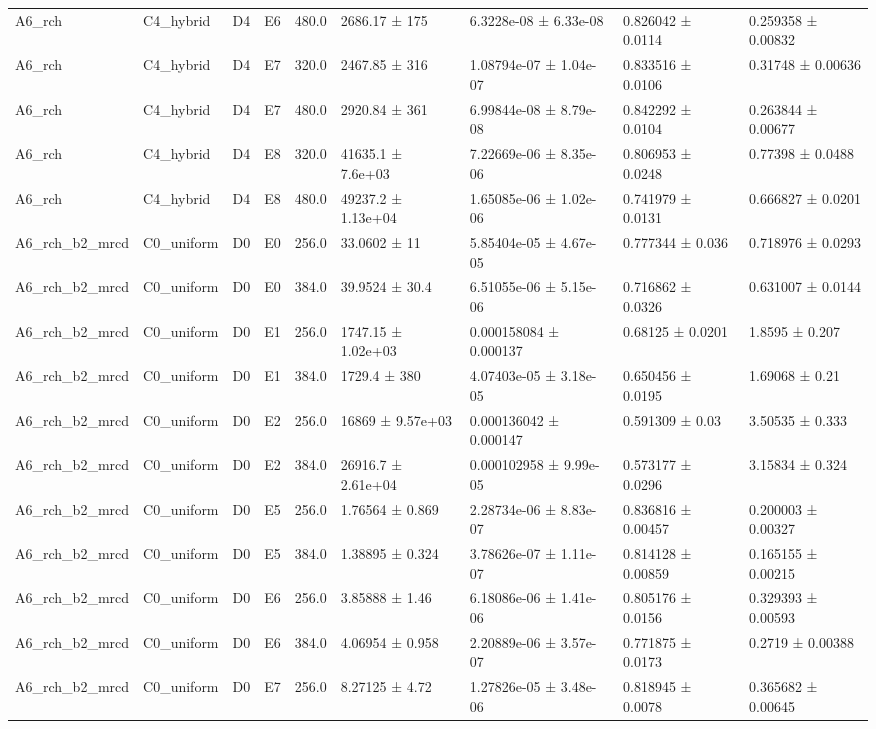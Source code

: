 \begin{table}
\begin{tabular}{lllllllll}
A6\_rch & C4\_hybrid & D4 & E6 & 480.0 & 2686.17 ± 175 & 6.3228e-08 ± 6.33e-08 & 0.826042 ± 0.0114 & 0.259358 ± 0.00832 \\
A6\_rch & C4\_hybrid & D4 & E7 & 320.0 & 2467.85 ± 316 & 1.08794e-07 ± 1.04e-07 & 0.833516 ± 0.0106 & 0.31748 ± 0.00636 \\
A6\_rch & C4\_hybrid & D4 & E7 & 480.0 & 2920.84 ± 361 & 6.99844e-08 ± 8.79e-08 & 0.842292 ± 0.0104 & 0.263844 ± 0.00677 \\
A6\_rch & C4\_hybrid & D4 & E8 & 320.0 & 41635.1 ± 7.6e+03 & 7.22669e-06 ± 8.35e-06 & 0.806953 ± 0.0248 & 0.77398 ± 0.0488 \\
A6\_rch & C4\_hybrid & D4 & E8 & 480.0 & 49237.2 ± 1.13e+04 & 1.65085e-06 ± 1.02e-06 & 0.741979 ± 0.0131 & 0.666827 ± 0.0201 \\
A6\_rch\_b2\_mrcd & C0\_uniform & D0 & E0 & 256.0 & 33.0602 ± 11 & 5.85404e-05 ± 4.67e-05 & 0.777344 ± 0.036 & 0.718976 ± 0.0293 \\
A6\_rch\_b2\_mrcd & C0\_uniform & D0 & E0 & 384.0 & 39.9524 ± 30.4 & 6.51055e-06 ± 5.15e-06 & 0.716862 ± 0.0326 & 0.631007 ± 0.0144 \\
A6\_rch\_b2\_mrcd & C0\_uniform & D0 & E1 & 256.0 & 1747.15 ± 1.02e+03 & 0.000158084 ± 0.000137 & 0.68125 ± 0.0201 & 1.8595 ± 0.207 \\
A6\_rch\_b2\_mrcd & C0\_uniform & D0 & E1 & 384.0 & 1729.4 ± 380 & 4.07403e-05 ± 3.18e-05 & 0.650456 ± 0.0195 & 1.69068 ± 0.21 \\
A6\_rch\_b2\_mrcd & C0\_uniform & D0 & E2 & 256.0 & 16869 ± 9.57e+03 & 0.000136042 ± 0.000147 & 0.591309 ± 0.03 & 3.50535 ± 0.333 \\
A6\_rch\_b2\_mrcd & C0\_uniform & D0 & E2 & 384.0 & 26916.7 ± 2.61e+04 & 0.000102958 ± 9.99e-05 & 0.573177 ± 0.0296 & 3.15834 ± 0.324 \\
A6\_rch\_b2\_mrcd & C0\_uniform & D0 & E5 & 256.0 & 1.76564 ± 0.869 & 2.28734e-06 ± 8.83e-07 & 0.836816 ± 0.00457 & 0.200003 ± 0.00327 \\
A6\_rch\_b2\_mrcd & C0\_uniform & D0 & E5 & 384.0 & 1.38895 ± 0.324 & 3.78626e-07 ± 1.11e-07 & 0.814128 ± 0.00859 & 0.165155 ± 0.00215 \\
A6\_rch\_b2\_mrcd & C0\_uniform & D0 & E6 & 256.0 & 3.85888 ± 1.46 & 6.18086e-06 ± 1.41e-06 & 0.805176 ± 0.0156 & 0.329393 ± 0.00593 \\
A6\_rch\_b2\_mrcd & C0\_uniform & D0 & E6 & 384.0 & 4.06954 ± 0.958 & 2.20889e-06 ± 3.57e-07 & 0.771875 ± 0.0173 & 0.2719 ± 0.00388 \\
A6\_rch\_b2\_mrcd & C0\_uniform & D0 & E7 & 256.0 & 8.27125 ± 4.72 & 1.27826e-05 ± 3.48e-06 & 0.818945 ± 0.0078 & 0.365682 ± 0.00645 \\

\end{tabular}
\end{table}
